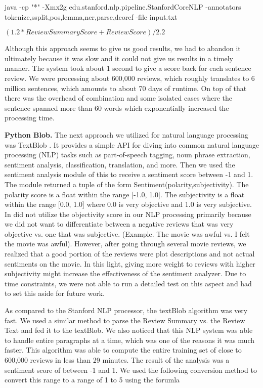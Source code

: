 \documentclass{article} %
\begin{document}
java -cp "*" -Xmx2g edu.stanford.nlp.pipeline.StanfordCoreNLP -annotators tokenize,ssplit,pos,lemma,ner,parse,dcoref -file input.txt

$(1.2 * Review Summary Score  + Review Score) /2.2$

Although this approach seems to give us good results, we had to abandon it ultimately because it was slow and it could not give us results in a timely manner. The system took about 1 second to give a score back for each sentence review. We were processing about 600,000 reviews, which roughly translates to 6 million sentences, which amounts to about 70 days of runtime. On top of that there was the overhead of combination and some isolated cases where the sentence spanned more than 60 words which exponentially increased the processing time. 

\textbf{Python Blob.} The next approach we utilized for natural language processing was TextBlob \cite{TextBlob}. It provides a simple API for diving into common natural language processing (NLP) tasks such as part-of-speech tagging, noun phrase extraction, sentiment analysis, classification, translation, and more. Then we used the sentiment analysis module of this to receive a sentiment score between -1 and 1. The module returned a tuple of the form Sentiment(polarity,subjectivity). The polarity score is a float within the range [-1.0, 1.0]. The subjectivity is a float within the range [0.0, 1.0] where 0.0 is very objective and 1.0 is very subjective. In did not utilize the objectivity score in our NLP processing primarily because we did not want to differentiate between a negative reviews that was very objective vs. one that was subjective. (Example. The movie was awful vs. I felt the movie was awful).  However, after going through several movie reviews, we realized that a good portion of the reviews were plot descriptions and not actual sentiments on the movie. In this light, giving more weight to reviews with higher subjectivity might increase the effectiveness of the sentiment analyzer. Due to time constraints, we were not able to run a detailed test on this aspect and had to set this aside for future work. 

As compared to the Stanford NLP processor, the textBlob algorithm was very fast. We used a similar method to parse the Review Summary vs. the Review Text and fed it to the textBlob. We also noticed that this NLP system was able to handle entire paragraphs at a time, which was one of the reasons it was much faster. This algorithm was able to compute the entire training set of close to 600,000 reviews in less than 29 minutes. The result of the analysis was a sentiment score of between -1 and 1. We used the following conversion method to convert this range to a range of 1 to 5 using the forumla
\end{document}

